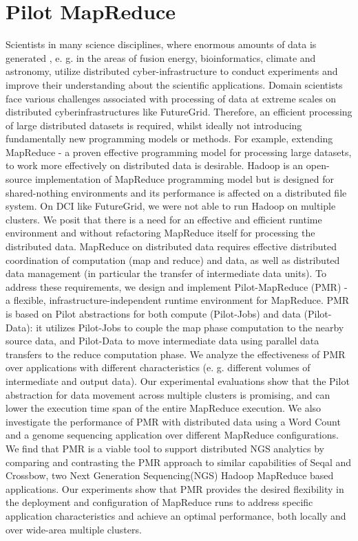 \documentclass[]{paper}
\begin{document}
\section{Pilot MapReduce}

Scientists in many science disciplines, where enormous amounts of data is generated , e. g. in the areas of fusion energy, bioinformatics, climate and astronomy, utilize distributed cyber-infrastructure to conduct experiments and improve their understanding about the scientific applications. Domain scientists face various challenges associated with processing of data at extreme scales on distributed cyberinfrastructures like FutureGrid. Therefore, an efficient processing of large distributed datasets is required, whilst ideally not introducing fundamentally new programming models or methods. For example, extending MapReduce - a proven effective programming model for processing large datasets, to work more effectively on distributed data is desirable. Hadoop is an open-source implementation of MapReduce programming model but is designed for shared-nothing environments and its performance is affected on a distributed file system.  On DCI like FutureGrid, we were not able to run Hadoop on multiple clusters.
We posit that there is a need for an effective and efficient runtime environment and without refactoring MapReduce itself for processing the distributed data. MapReduce on distributed data requires effective distributed coordination of computation (map and reduce) and data, as well as distributed data management (in particular the transfer of intermediate data units). To address these requirements, we design and implement Pilot-MapReduce (PMR) - a flexible, infrastructure-independent runtime environment for MapReduce. PMR is based on Pilot abstractions for both compute (Pilot-Jobs) and data (Pilot-Data): it utilizes Pilot-Jobs to couple the map phase computation to the nearby source data, and Pilot-Data to move intermediate data using parallel data transfers to the reduce computation phase. We analyze the effectiveness of PMR over applications with different characteristics (e. g. different volumes of intermediate and output data). Our experimental evaluations show that the Pilot abstraction for data movement across multiple clusters is promising, and can lower the execution time span of the entire MapReduce execution. We also investigate the performance of PMR with distributed data using a Word Count and a genome sequencing application over different MapReduce configurations.  We find that PMR is a viable tool to support distributed NGS analytics by comparing and contrasting the PMR approach to similar capabilities of Seqal and Crossbow, two Next Generation Sequencing(NGS) Hadoop MapReduce based applications. Our experiments show that PMR provides the desired flexibility in the deployment and configuration of MapReduce runs to address specific application characteristics and achieve an optimal performance, both locally and over wide-area multiple clusters.
\end{document}
